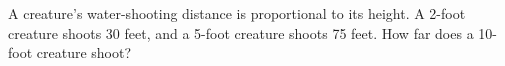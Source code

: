 A creature's water-shooting distance is proportional to its height. A 2-foot creature shoots 30 feet, and a 5-foot creature shoots 75 feet. How far does a 10-foot creature shoot?
